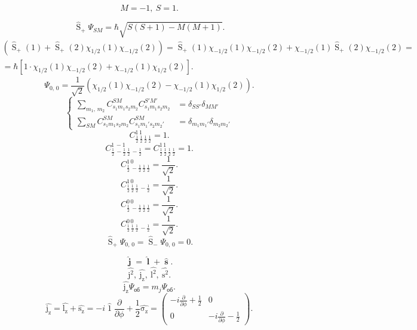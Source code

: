 \documentclass[a4paper]{article}
\begin{document}
\begin{sol}
\begin{enumerate}
\[		M=-1,\ S=1
	.\] 
\end{enumerate}
\[
	\widehat{\operatorname{S}}_+ \Psi_{SM}= \hbar \sqrt{S(S+1)-
	M(M+1)} 
.\] 
\begin{multline*}
	\left( \widehat{\operatorname{S}}_+(1)+\widehat{\operatorname{S}}_+ (2)\chi_{1 /2}(1)\chi_{- 1 /2}(2) \right) =
	\widehat{\operatorname{S}}_+(1)\chi_{-1 /2}(1) \chi_{-1 /2}
	(2)+\chi_{- 1 /2}(1) \widehat{\operatorname{S}}_+(2)
	\chi_{-1 /2}(2)=\\=\hbar \left[ 1\cdot \chi_{1 /2}(1)
	\chi_{-1 /2}(2)+\chi_{- 1 /2}(1)\chi_{1 /2}(2)\right] 
.\end{multline*} 
\[
	\Psi_{0,\,0}=\frac{1}{\sqrt{2} }\left( \chi_{1 /2}(1)
	\chi_{- 1 /2}(2)-\chi_{-1 /2}(1)\chi_{1 /2}(2)\right) 
.\] 
\[
	\left\{
	\begin{aligned}
	\sum_{m_1,\,m_2}^{} C^{SM}_{s_1 m_1 s_2 m_2} C_{s_1 m_1 s_2
	m_2}^{S'M'}&=\delta_{SS'}\delta_{MM'}\\
	\sum_{SM} C^{SM}_{s_1 m_1 s_2 m_2} C^{SM}_{s_1 m_1' s_2 m_2'}
	&= \delta_{m_1 m_1'}\delta_{m_2 m_2'}
	\end{aligned}
	\right.
\] 
\[
C_{\frac{1}{2}\, \frac{1}{2}\, \frac{1}{2}\, \frac{1}{2}}^{1\, 1}=1
.\] 
\[
C_{\frac{1}{2}\, -\frac{1}{2}\, \frac{1}{2}\, -\frac{1}{2}}^{1\, -1}=
C_{\frac{1}{2}\, \frac{1}{2}\, \frac{1}{2}\, \frac{1}{2}}^{1\, 1}=1
.\] 
\[
C_{\frac{1}{2}\, -\frac{1}{2}\, \frac{1}{2}\, \frac{1}{2}}^{1\, 0}=
\frac{1}{\sqrt{2} }
.\] 
\[
C_{\frac{1}{2}\, \frac{1}{2}\, \frac{1}{2}\, -\frac{1}{2}}^{1\, 0}=
\frac{1}{\sqrt{2} }
.\] 
\[
C_{\frac{1}{2}\, -\frac{1}{2}\, \frac{1}{2}\, \frac{1}{2}}^{0\, 0}=
\frac{1}{\sqrt{2} }
.\] 
\[
C_{\frac{1}{2}\, \frac{1}{2}\, \frac{1}{2}\, -\frac{1}{2}}^{0\, 0}=
\frac{1}{\sqrt{2} }
.\]
\[
\widehat{\operatorname{S}}_+ \Psi_{0,\,0}= \widehat{\operatorname{S}}_- \Psi_{0,\,0}=0
.\] 
\end{sol}
\begin{hiProb}[Задача 7б]
\end{hiProb}
\begin{sol}
\[
	\widehat{\operatorname{\mathbf{j}}}=\widehat{\operatorname{\mathbf{l}}}+ \widehat{\operatorname{\mathbf{s}}}
.\] 
\[
	\widehat{\operatorname{j^2}},\ 
		\widehat{\operatorname{j_z}},\
		\widehat{\operatorname{l^2}},\
		\widehat{\operatorname{s^2}}
.\] 
\[
\widehat{\operatorname{j_z}}\Psi_{\text{об}}=m_j \Psi_\text{об}
.\] 
\[
\widehat{\operatorname{j_z}}=\widehat{\operatorname{l_z}}+\widehat{\operatorname{s_z}}=-i \widehat{\operatorname{1}}\frac{\partial }{\partial \phi} + \frac{1}{2}\widehat{\operatorname{\sigma_z}}=
\begin{pmatrix} -i \frac{\partial }{\partial \phi} +\frac{1}{2}&
0\\ 0& -i \frac{\partial }{\partial \phi} -\frac{1}{2}\end{pmatrix} 
.\] 
\end{sol}
\end{document}
